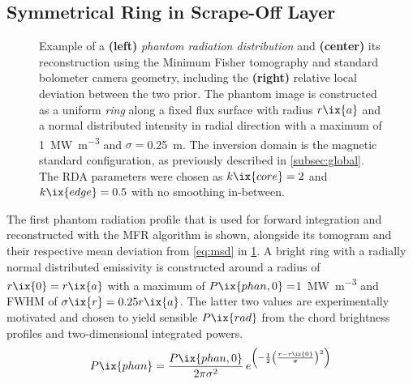         \subsection{Symmetrical Ring in Scrape-Off Layer}\label{subsec:phantoms_symmring}%
%
            \begin{figure}[t]%
                \centering%
                \caption{Example of a \textbf{(left)} \textit{phantom radiation distribution} and \textbf{(center)} its reconstruction using the Minimum Fisher tomography and standard bolometer camera geometry, including the \textbf{(right)} relative local deviation between the two prior. The phantom image is constructed as a uniform \textit{ring} along a fixed flux surface with radius $r\ix{a}$ and a normal distributed intensity in radial direction with a maximum of \SI{1}{\mega\watt\per\cubic\meter} and $\sigma=$\SI{0.25}{\meter}. The inversion domain is the magnetic standard configuration, as previously described in \cref{subsec:global}. The RDA parameters were chosen as $k\ix{core}=2$ and $k\ix{edge}=0.5$ with no smoothing in-between.}\label{fig:phantom_fsring_example}%
            \end{figure}%
%
            The first phantom radiation profile that is used for forward integration and reconstructed with the MFR algorithm is shown, alongside its tomogram and their respective mean deviation from \cref{eq:msd} in \cref{fig:phantom_fsring_example}. A bright ring with a radially normal distributed emissivity is constructed around a radius of $r\ix{0}=r\ix{a}$ with a maximum of $P\ix{phan,0}=$\SI{1}{\mega\watt\per\cubic\meter} and FWHM of $\sigma\ix{r}=0.25r\ix{a}$. The latter two values are experimentally motivated and chosen to yield sensible $P\ix{rad}$ from the chord brightness profiles and two-dimensional integrated powers.%
%
            \begin{align}%
                P\ix{phan}=\frac{P\ix{phan,0}}{2\pi\sigma^{2}}\,e^{\left(-\frac{1}{2}\left(\frac{r-r\ix{0}}{\sigma}\right)^{2}\right)}\nonumber%
            \end{align}%
%
